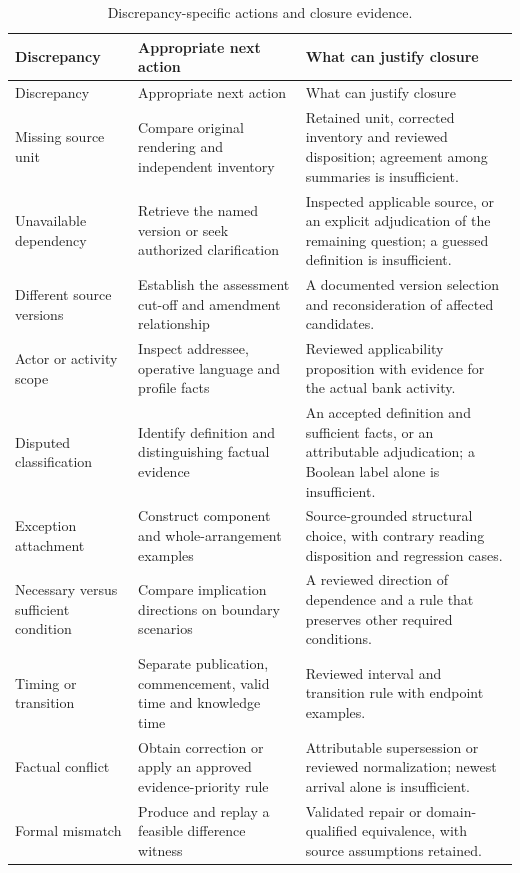 \begin{longtable}{@{}P{27mm}P{56mm}P{65mm}@{}}
\caption{Discrepancy-specific actions and closure evidence.}\label{tab:resolution-matrix}\\
\toprule
Discrepancy & Appropriate next action & What can justify closure\\\midrule\endfirsthead
\toprule Discrepancy & Appropriate next action & What can justify closure\\\midrule\endhead
Missing source unit & Compare original rendering and independent inventory & Retained unit, corrected inventory and reviewed disposition; agreement among summaries is insufficient.\\
Unavailable dependency & Retrieve the named version or seek authorized clarification & Inspected applicable source, or an explicit adjudication of the remaining question; a guessed definition is insufficient.\\
Different source versions & Establish the assessment cut-off and amendment relationship & A documented version selection and reconsideration of affected candidates.\\
Actor or activity scope & Inspect addressee, operative language and profile facts & Reviewed applicability proposition with evidence for the actual bank activity.\\
Disputed classification & Identify definition and distinguishing factual evidence & An accepted definition and sufficient facts, or an attributable adjudication; a Boolean label alone is insufficient.\\
Exception attachment & Construct component and whole-arrangement examples & Source-grounded structural choice, with contrary reading disposition and regression cases.\\
Necessary versus sufficient condition & Compare implication directions on boundary scenarios & A reviewed direction of dependence and a rule that preserves other required conditions.\\
Timing or transition & Separate publication, commencement, valid time and knowledge time & Reviewed interval and transition rule with endpoint examples.\\
Factual conflict & Obtain correction or apply an approved evidence-priority rule & Attributable supersession or reviewed normalization; newest arrival alone is insufficient.\\
Formal mismatch & Produce and replay a feasible difference witness & Validated repair or domain-qualified equivalence, with source assumptions retained.\\

\end{longtable}

